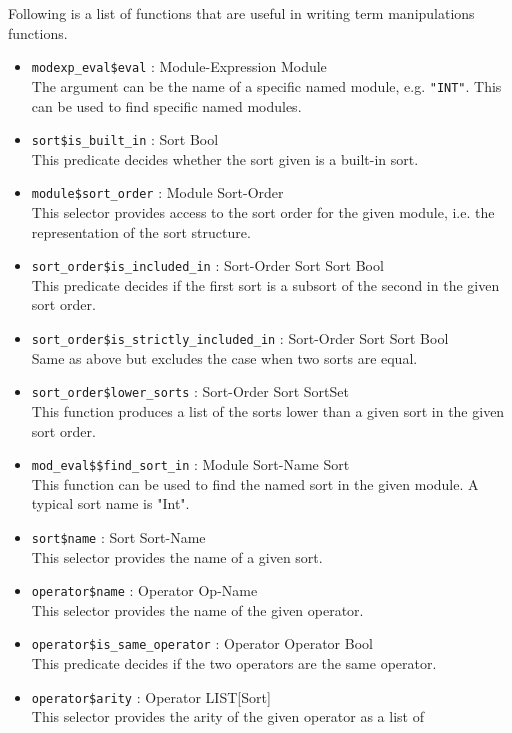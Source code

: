 Following is a list of functions that are useful in writing
term manipulations functions.
\begin{itemize}
\item {\tt modexp\_eval\$eval} : Module-Expression \ra Module\\
The argument can be the name of a specific named module, e.g. {\tt "INT"}.
This can be used to find specific named modules.
\item {\tt sort\$is\_built\_in} : Sort \ra Bool\\
This predicate decides whether the sort given is a built-in sort.
\item {\tt module\$sort\_order} : Module  \ra Sort-Order\\
This selector provides access to the sort order for the given module, i.e.
the representation of the sort structure.
\item {\tt sort\_order\$is\_included\_in} : Sort-Order Sort Sort  \ra Bool\\
This predicate decides if the first sort is a subsort of the second in
the given sort order.
\item {\tt sort\_order\$is\_strictly\_included\_in} : Sort-Order Sort Sort  \ra Bool\\
Same as above but excludes the case when two sorts are equal.
\item {\tt sort\_order\$lower\_sorts} : Sort-Order Sort  \ra SortSet\\
This function produces a list of the sorts lower than a given sort
in the given sort order.
\item {\tt mod\_eval\$\$find\_sort\_in} : Module Sort-Name \ra Sort\\
This function can be used to find the named sort in the given module.
A typical sort name is "Int".
\item {\tt sort\$name} : Sort \ra Sort-Name\\
This selector provides the name of a given sort.
\item {\tt operator\$name} : Operator \ra Op-Name\\
This selector provides the name of the given operator.
\item {\tt operator\$is\_same\_operator} : Operator Operator \ra Bool\\
This predicate decides if the two operators are the same operator.
\item {\tt operator\$arity} : Operator \ra LIST[Sort]\\
This selector provides the arity of the given operator as a list of

\end{itemize}
